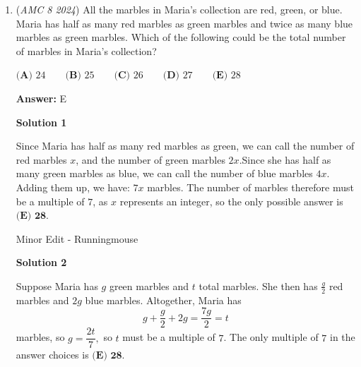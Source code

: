 \begin{enumerate}
 



\textbf{Solution 2}

Continue as in Solution 1 to get $7$, $8$, or $10$ dollars by the 2nd day. The only way to get the same dollar amount occurring twice by branching (multiply by $2$ or adding $3$) from here is if $7+3=10\cdot 2$ or $7+3=8\cdot 2$ which both aren't true. Hence our answer is $3\cdot2=\boxed{\textbf{(D)\ 6}}$. 

 



\textbf{Solution 3 (Brute Force)}

Let $a$ represent Taye adding $3$ dollars and $d$ represent Taye doubling his money.We can list out all the possibilities:$a$ => $a$ => $a$ = $11$, $a$ => $a$ => $d$ = $16$, $a$ => $d$ => $a$ = $12$, $a$ => $d$ => $d$ = $20$, $d$ => $a$ => $a$ = $10$, $d$ => $a$ => $d$ = $14$, $d$ => $d$ => $a$ = $11$, $d$ => $d$ => $d$ = $16$. The unique values are $10,11,12,14,16,20$. Thus, our desired answer is $\boxed{\textbf{(D)\ 6}}$



	\item (\textit{AMC 8 2024}) All the marbles in Maria's collection are red, green, or blue. Maria has half as many red marbles as green marbles and twice as many blue marbles as green marbles. Which of the following could be the total number of marbles in Maria's collection?


 $\textbf{(A) } 24\qquad\textbf{(B) } 25\qquad\textbf{(C) } 26\qquad\textbf{(D) } 27\qquad\textbf{(E) } 28$

 \textbf{Answer: }E



\textbf{Solution 1}

Since Maria has half as many red marbles as green, we can call the number of red marbles $x$, and the number of green marbles $2x$.Since she has half as many green marbles as blue, we can call the number of blue marbles $4x$. Adding them up, we have: $7x$ marbles. The number of marbles therefore must be a multiple of $7$, as $x$ represents an integer, so the only possible answer is $\boxed{\textbf{(E) 28}}.$

 Minor Edit - Runningmouse

 



\textbf{Solution 2}

Suppose Maria has $g$ green marbles and $t$ total marbles. She then has $\frac{g}{2}$ red marbles and $2g$ blue marbles. Altogether, Maria has
 \[g + \frac{g}{2} + 2g = \frac{7g}{2} = t\]marbles, so $g = \dfrac{2t}{7},$ so $t$ must be a multiple of $7$. The only multiple of $7$ in the answer choices is $\boxed{\textbf{(E) 28}}.$


\end{enumerate}
